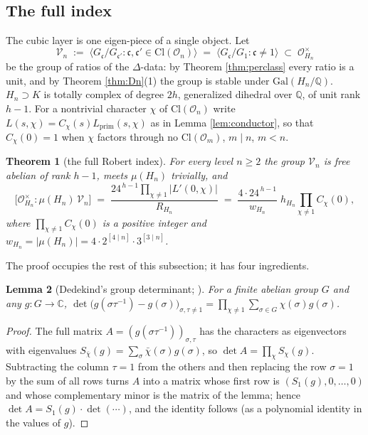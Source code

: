 \documentclass[11pt]{amsart}
\numberwithin{equation}{section}
\theoremstyle{plain}
\newtheorem{theorem}{Theorem}[section]
\newtheorem{lemma}[theorem]{Lemma}
\theoremstyle{definition}
\theoremstyle{remark}
\newcommand{\C}{\mathbb{C}}
\newcommand{\Q}{\mathbb{Q}}
\newcommand{\Gal}{\mathrm{Gal}}
\newcommand{\Cl}{\mathrm{Cl}}
\newcommand{\idealc}{\mathfrak{c}}
\newcommand{\Lprim}{L_{\mathrm{prim}}}
\newcommand{\Oc}{\mathcal{O}}
\begin{document}
\subsection{The full index}\label{subsec:fullindex}

The cubic layer is one eigen-piece of a single object.  Let
\[
  \mathcal{V}_n \;:=\; \bigl\langle G_\idealc/G_{\idealc'} :
  \idealc, \idealc' \in \Cl(\Oc_n)\bigr\rangle
  \;=\; \bigl\langle G_\idealc/G_1 : \idealc \ne 1\bigr\rangle
  \;\subset\; \Oc_{H_n}^\times
\]
be the group of ratios of the $\Delta$-data: by Theorem \ref{thm:perclass}
every ratio is a unit, and by Theorem \ref{thm:Dn}(1) the group is stable
under $\Gal(H_n/\Q)$.  $H_n \supset K$ is totally complex of degree $2h$,
generalized dihedral over $\Q$, of unit rank $h - 1$.  For a nontrivial
character $\chi$ of $\Cl(\Oc_n)$ write $L(s,\chi) = C_\chi(s)\Lprim(s,\chi)$
as in Lemma \ref{lem:conductor}, so that $C_\chi(0) = 1$ when $\chi$
factors through no $\Cl(\Oc_m)$, $m \mid n$, $m < n$.

\begin{theorem}[the full Robert index]\label{thm:fullindex}
For every level $n \ge 2$ the group $\mathcal{V}_n$ is free abelian of
rank $h - 1$, meets $\mu(H_n)$ trivially, and
\[
  \bigl[\Oc_{H_n}^\times : \mu(H_n)\,\mathcal{V}_n\bigr]
  \;=\; \frac{24^{\,h-1}\prod_{\chi\ne1}|L'(0,\chi)|}{R_{H_n}}
  \;=\; \frac{4\cdot 24^{\,h-1}}{w_{H_n}}\;h_{H_n}\prod_{\chi\ne1}C_\chi(0),
\]
where $\prod_{\chi\ne1}C_\chi(0)$ is a positive integer and
$w_{H_n} = |\mu(H_n)| = 4\cdot2^{[4\mid n]}\cdot3^{[3\mid n]}$.
\end{theorem}

The proof occupies the rest of this subsection; it has four
ingredients.

\begin{lemma}[Dedekind's group determinant; {\cite[Lemma~5.26]{Washington1997}}]
\label{lem:dedekind}
For a finite abelian group $G$ and any $g: G \to \C$,
$\det\bigl(g(\sigma\tau^{-1}) - g(\sigma)\bigr)_{\sigma,\tau\ne1} =
\prod_{\chi\ne1}\sum_{\sigma\in G}\chi(\sigma)g(\sigma)$.
\end{lemma}

\begin{proof}
The full matrix $A = (g(\sigma\tau^{-1}))_{\sigma,\tau}$ has the
characters as eigenvectors with eigenvalues $S_{\bar\chi}(g) =
\sum_\sigma\bar\chi(\sigma)g(\sigma)$, so $\det A = \prod_\chi S_\chi(g)$.
Subtracting the column $\tau = 1$ from the others and then replacing the
row $\sigma = 1$ by the sum of all rows turns $A$ into a matrix whose first
row is $(S_1(g), 0, \dots, 0)$ and whose complementary minor is the matrix
of the lemma; hence $\det A = S_1(g)\cdot\det(\cdots)$, and the identity
follows (as a polynomial identity in the values of $g$).
\end{proof}
\end{document}
